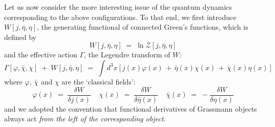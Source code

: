 \documentclass[a4paper,12pt]{article}
\begin{document}
   
Let us now consider the more interesting issue of the quantum dynamics
corresponding to the above configurations. To that end, we first
introduce $W[j,{\bar\eta}, \eta]$, the generating functional of
connected Green's functions, which is defined by
\begin{equation}
  \label{eq:defw}
W[j,{\bar\eta},\eta] \;=\; \ln {\mathcal Z}[j,{\bar\eta},\eta]
\end{equation}
and the effective action $\Gamma$, the Legendre transform of $W$:
\begin{equation}
  \label{eq:defga}
\Gamma[\varphi,{\bar\chi},\chi]\;+\;W[j,{\bar\eta},\eta]\;=\; \int d^3x [j(x) \varphi(x) \,+\, {\bar\eta}(x) \chi(x) 
\,+\, {\bar\chi}(x) \eta (x) ]
\end{equation}
where $\varphi$, ${\bar\chi}$ and $\chi$ are the `classical fields':
\begin{equation}
  \label{eq:defclf}
\varphi(x) \;=\; \frac{\delta W}{\delta j(x)} 
\;\;\;\;
\chi(x) \;=\; \frac{\delta W}{\delta {\bar\eta}(x)} 
\;\;\;\;
{\bar\chi}(x) \;=\; - \frac{\delta W}{\delta\eta(x)} 
\end{equation}
and we adopted the convention that functional derivatives of Grassmann
objects always act {\em from the left of the corresponding object}.
\end{document}

